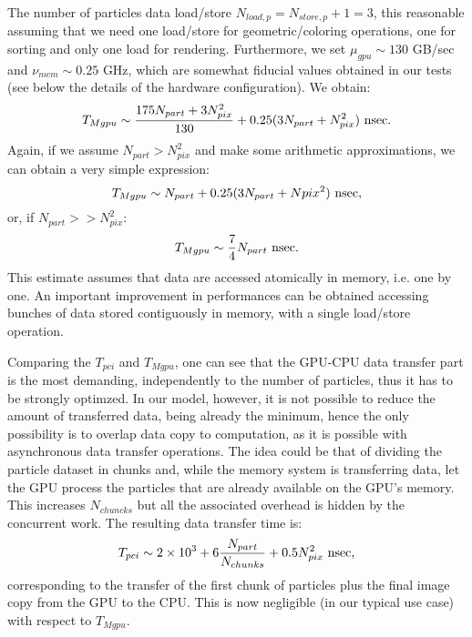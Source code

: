 \documentclass[11pt]{article}
\begin{document}
The number of particles data load/store $N_{load,p} = 
N_{store,p}+1 = 3$, this reasonable assuming that we need one load/store
for geometric/coloring operations, one for sorting and only one load
for rendering. Furthermore, we 
set $\mu_{gpu} \sim 130$ GB/sec and $\nu_{mem} \sim 0.25$ GHz, which are somewhat
fiducial values obtained in our tests (see below the details of the 
hardware configuration). We obtain:
\begin{equation}
T_{Mgpu} \sim {175 N_{part} + 3 N_{pix}^2\over 130} + 0.25 (3 N_{part} + N_{pix}^2)\ {\rm nsec}.
\end{equation}
Again, if we assume $N_{part} > N_{pix}^2$ and make some arithmetic approximations,
we can obtain a very simple expression:
\begin{equation}
T_{Mgpu} \sim N_{part} + 0.25 (3 N_{part} + N{pix}^2)\ {\rm nsec},
\end{equation}
or, if $N_{part} >> N_{pix}^2$:
\begin{equation}
T_{Mgpu} \sim {7\over 4} N_{part}\ {\rm nsec}.
\end{equation}
This estimate assumes that data are accessed atomically in memory, i.e. one by one.
An important improvement in performances can be obtained accessing bunches 
of data stored contiguously in memory, with a single load/store operation.

Comparing the $T_{pci}$ and $T_{Mgpu}$, one can see that the GPU-CPU data transfer
part is the most demanding, independently to the number of particles, thus
it has to be strongly optimzed. In our model, however, it is not possible to 
reduce the amount of transferred data, being already the minimum, hence the only possibility is to
overlap data copy to computation, as it is possible with asynchronous
data transfer operations. The idea could be that of dividing the particle 
dataset in chunks and, while the memory system is transferring data,
let the GPU process the particles that are already available on the 
GPU's memory. This increases $N_{chuncks}$ but all the associated overhead 
is hidden by the concurrent work. The resulting data transfer time is:
\begin{equation}
T_{pci} \sim 2 \times 10^3 + 6 {N_{part}\over N_{chunks}} + 0.5 N_{pix}^2\ {\rm nsec},
\end{equation}
corresponding to the transfer of the first chunk of particles plus the final image copy 
from the GPU to the CPU. This is now negligible (in our typical use case) with respect to
$T_{Mgpu}$.
\end{document}
